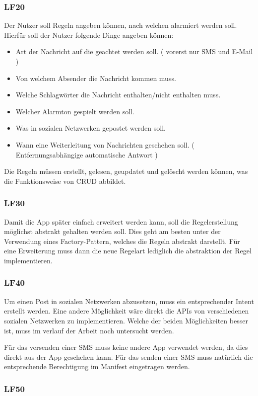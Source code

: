 \subsubsection{LF20}
Der Nutzer soll Regeln angeben k\"onnen, nach welchen alarmiert werden soll. Hierf\"ur soll der Nutzer folgende Dinge angeben k\"onnen:
\begin{itemize}
 \item Art der Nachricht auf die geachtet werden soll. ( vorerst nur SMS und E-Mail )
 \item Von welchem Absender die Nachricht kommen muss.
 \item Welche Schlagw\"orter die Nachricht enthalten/nicht enthalten muss.
 \item Welcher Alarmton gespielt werden soll.
 \item Was in sozialen Netzwerken gepostet werden soll.
 \item Wann eine Weiterleitung von Nachrichten geschehen soll. ( Entfernungsabh\"angige automatische Antwort )
\end{itemize}

Die Regeln m\"ussen erstellt, gelesen, geupdatet und gel\"oscht werden k\"onnen, was die Funktionsweise von CRUD abbildet.

\subsubsection{LF30}
Damit die App sp\"ater einfach erweitert werden kann, soll die Regelerstellung m\"oglichst abstrakt gehalten werden soll. Dies geht am besten unter der Verwendung eines Factory-Pattern, welches die Regeln abstrakt darstellt. F\"ur eine Erweiterung muss dann die neue Regelart lediglich die abstraktion der Regel implementieren. 

\subsubsection{LF40}
Um einen Post in sozialen Netzwerken abzusetzen, muss ein entsprechender Intent erstellt werden. Eine andere M\"oglichkeit w\"are direkt die APIs von verschiedenen sozialen Netzwerken zu implementieren. Welche der beiden M\"oglichkeiten besser ist, muss im verlauf der Arbeit noch untersucht werden.

F\"ur das versenden einer SMS muss keine andere App verwendet werden, da dies direkt aus der App geschehen kann. F\"ur das senden einer SMS muss nat\"urlich die entsprechende Berechtigung im Manifest eingetragen werden.

\subsubsection{LF50}
